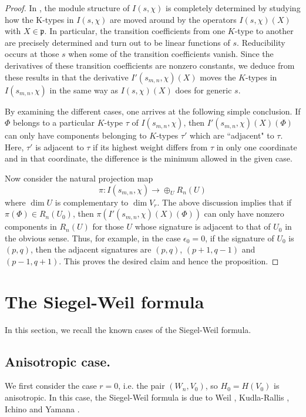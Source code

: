 \documentclass[10pt]{amsart}
\theoremstyle{plain}
\numberwithin{equation}{section}
\begin{document}
\begin{proof}
In \cite{L1, L2}, the module structure of $I(s,\chi)$ is completely
determined by studying how the K-types in $I(s,\chi)$ are moved around
by the operators  $I(s,\chi)(X)$ with $X \in \mathfrak{p}$. In
particular, the transition coefficients from one $K$-type to another
are precisely determined and turn out to be linear functions of
$s$. Reducibility occurs at those $s$ when some of the transition
coefficients vanish.  Since the derivatives of these transition
coefficients are nonzero constants, 
we deduce from these results in \cite{L1, L2} that the derivative
$I'(s_{m,n},\chi)(X)$ moves the $K$-types in $I(s_{m,n},\chi)$ in the
same way as $I(s,\chi)(X)$ does for generic $s$. 
\vskip 5pt

By examining the different cases, one arrives at the following simple
conclusion.   If $\Phi $ belongs to a particular $K$-type $\tau$ of
$I(s_{m,n},\chi)$, then  $I'(s_{m,n},\chi)(X)(\Phi)$ can only have
components belonging to  $K$-types $\tau'$ which are ``adjacent" to
$\tau$. Here, $\tau'$ is adjacent to $\tau$ if its highest weight
differs from $\tau$ in only one coordinate and in that coordinate, the
difference is the minimum allowed in the given case. 
\vskip 5pt

Now consider the natural projection map 
\[ \pi:  I(s_{m,n},\chi) \longrightarrow \oplus_U R_n(U) \]
 where $\dim U$ is complementary to $\dim V_r$.  The above discussion
 implies that if $\pi(\Phi) \in R_n(U_0)$, then
 $\pi(I'(s_{m,n},\chi)(X)(\Phi))$ can only have nonzero components in
 $R_n(U)$ for those $U$ whose signature is adjacent to that of $U_0$
 in the obvious sense.  
 Thus, for example, in the case $\epsilon_0 = 0$, if the signature of
 $U_0$ is $(p,q)$, then the adjacent signatures are $(p,q)$, $(p+1,
 q-1)$ and $(p-1, q+1)$. 
 This proves the desired claim and hence the proposition.
 \end{proof}
 \vskip 15pt

\section{\bf The Siegel-Weil formula}
In this section, we recall the known cases of the Siegel-Weil formula.  
\vskip 5pt

\subsection{\bf Anisotropic case.}
We first consider the case $r=0$, i.e. the pair $(W_n, V_0)$, so $H_0=H(V_0)$ is
anisotropic. In this case, the Siegel-Weil formula is due to Weil
\cite{We}, Kudla-Rallis \cite{KR1}, Ichino \cite{I3}  and Yamana \cite{Y2}.
\end{document}

